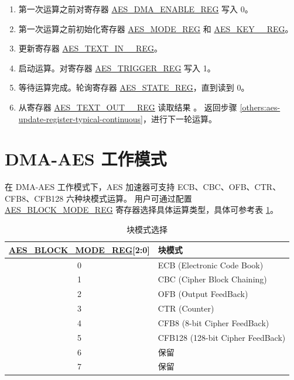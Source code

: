 \documentclass[main\_\_CN.tex]{subfiles}
\begin{document}
\begin{enumerate}
    \item 第一次运算之前对寄存器 \hyperref[regdesc:AESDMAENABLEREG]{AES\_DMA\_ENABLE\_REG} 写入 0。
    \item 第一次运算之前初始化寄存器 \hyperref[regdesc:AESMODEREG]{AES\_MODE\_REG} 和 \hyperref[regdesc:AESKEYnREG]{AES\_KEY\_\_REG}。
    \item 更新寄存器 \hyperref[regdesc:AESTEXTINnREG]{AES\_TEXT\_IN\_\_REG}。 \label{others:aes-update-register-typical-continuous}
    \item 启动运算。对寄存器 \hyperref[regdesc:AESTRIGGERREG]{AES\_TRIGGER\_REG} 写入 1。
    \item 等待运算完成。轮询寄存器 \hyperref[regdesc:AESSTATEREG]{AES\_STATE\_REG}，直到读到 0。
    \item 从寄存器 \hyperref[regdesc:AESTEXTOUTnREG]{AES\_TEXT\_OUT\_\_REG} 读取结果 \label{read result in typical AES continuous calculation}。 返回步骤 \ref{others:aes-update-register-typical-continuous}，进行下一轮运算。
\end{enumerate}


\section{DMA-AES 工作模式}\label{sec:aes-dma-aes}

在 DMA-AES 工作模式下，AES 加速器可支持 ECB、CBC、OFB、CTR、CFB8、CFB128 六种块模式运算。
用户可通过配置 \hyperref[regdesc:AESBLOCKMODEREG]{AES\_BLOCK\_MODE\_REG} 寄存器选择具体运算类型，具体可参考表 \ref{tab:aes-block-mode}。

\begin{longtable}[c]{ | c | l | }
\caption{块模式选择}
\label{tab:aes-block-mode}
\\\hline 
\rowcolor{lightgray}
\textbf{\hyperref[regdesc:AESBLOCKMODEREG]{AES\_BLOCK\_MODE\_REG}[2:0]}     & \textbf{块模式}\\
    \hline
    0                          & ECB (Electronic Code Book)    \\
    \hline
    1                          & CBC (Cipher Block Chaining)     \\
    \hline
    2                          & OFB (Output FeedBack)    \\
    \hline
    3                          & CTR (Counter)    \\
    \hline
    4                          & CFB8 (8-bit Cipher FeedBack)    \\
    \hline
    5                          & CFB128 (128-bit Cipher FeedBack) \\
    \hline
    6                          & 保留     \\
    \hline
    7                          & 保留     \\
    \hline
\end{longtable}
\end{document}
